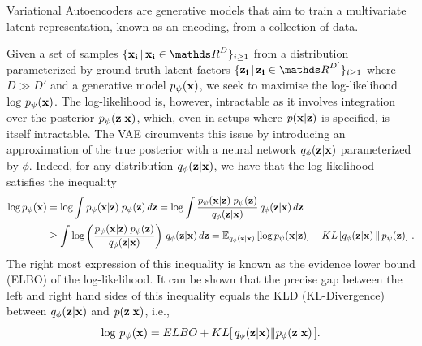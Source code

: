 \documentclass[onefignum,onetabnum]{siamonline190516}
\begin{document}
Variational Autoencoders \cite{kingma2013auto}  are generative models that aim to train a multivariate latent representation, known as an encoding, from a collection of data.  

Given a set of samples $\{\mathbf{x_i}\,|\,\mathbf{x_i} \in \R^D \}_{i\geq1}$ from a distribution parameterized by ground truth latent factors $\{\mathbf{z_i}\,|\,\mathbf{z_i} \in \R^{D'} \}_{i\geq1}$ where $D \gg D'$ and a generative model $p_{\psi}({\mathbf{x}})$, we seek to maximise the log-likelihood $\log \, p_{\psi}({\mathbf{x}})$. The log-likelihood is, however, intractable as it involves integration over the posterior $p_{\psi}({\mathbf{z}}|{\mathbf{x}})$, which, even in setups where $p({\mathbf{x}}|{\mathbf{z}})$ is specified, is itself intractable. The VAE circumvents this issue by introducing an approximation of the true posterior with a neural network $q_{\phi}({\mathbf{z}}|{\mathbf{x}})$ parameterized by $\phi$. Indeed, for any distribution $q_\phi({\mathbf{z}}|{\mathbf{x}})$, we have that the log-likelihood satisfies the inequality
\begin{subequations}
{
\begin{align*}
    \log p_\psi(\x)
    &= \log \int p_\psi(\x|\z)\;p_\psi(\z)\,d\z
    = \log \int \frac{p_\psi(\x|\z)\;p_\psi(\z)}{q_\phi(\z|\x)}\,q_\phi(\z|\x)\,d\z
    \\
    &\ge \int \log\left(\frac{p_\psi(\x|\z)\;p_\psi(\z)}{q_\phi(\z|\x)}\right) \,q_\phi(\z|\x)\,d\z
    = \E_{q_\phi(\z|\x)}\left[ \log p_\psi(\x|\z) \right] - KL\left[q_\phi(\z|\x)\,\|\,p_\psi(\z)\right]\,.
\end{align*}%
}%
\end{subequations}%
The right most expression of this inequality is known as the evidence lower bound (ELBO) of the log-likelihood. It can be shown that the precise gap between the left and right hand sides of this inequality equals the KLD (KL-Divergence) between $q_{\phi}({\mathbf{z}}|{\mathbf{x}})$ and $p({\mathbf{z}}|{\mathbf{x}})$, i.e.,
\begin{equation}
    \log \, p_{\psi}({\mathbf{x}}) = ELBO + KL[\,q_{\phi}({\mathbf{z}}|{\mathbf{x}}) \lVert p_{\phi}({\mathbf{z}}|{\mathbf{x}})\,].
\end{equation}
\end{document}
